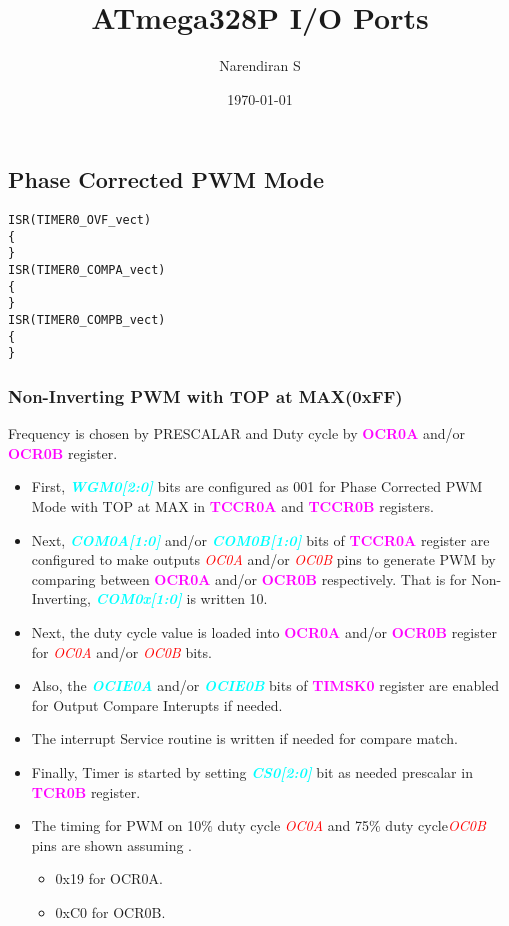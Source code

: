 \documentclass{article}
\title{ATmega328P I/O Ports}
\author{Narendiran S}
\date{\today}
\newcommand{\bitFormat}[1]{\emph{\textbf{\textcolor{cyan}{#1}}}}
\newcommand{\regFormat}[1]{\textbf{\textcolor{magenta}{#1}}}
\newcommand{\pinFormat}[1]{\emph{\textcolor{red}{#1}}}
\begin{document}
\maketitle
\subsection{Phase Corrected PWM Mode}
\begin{verbatim}
ISR(TIMER0_OVF_vect)
{
} 
ISR(TIMER0_COMPA_vect)
{
}
ISR(TIMER0_COMPB_vect)
{
}
\end{verbatim}
\subsubsection{Non-Inverting PWM with TOP at MAX(0xFF)}
\quad Frequency is chosen by PRESCALAR and Duty cycle by \regFormat{OCR0A} and/or \regFormat{OCR0B} register.
\begin{itemize}
    \item First, \bitFormat{WGM0[2:0]} bits are configured as 001 for Phase Corrected PWM Mode with TOP at MAX in \regFormat{TCCR0A} and \regFormat{TCCR0B} registers.
    \item Next, \bitFormat{COM0A[1:0]} and/or \bitFormat{COM0B[1:0]} bits of \regFormat{TCCR0A} register are configured to make outputs \pinFormat{OC0A} and/or \pinFormat{OC0B} pins to generate PWM by comparing between \regFormat{OCR0A} and/or \regFormat{OCR0B} respectively. That is for Non-Inverting, \bitFormat{COM0x[1:0]} is written 10.
    \item Next, the duty cycle value is loaded into \regFormat{OCR0A} and/or \regFormat{OCR0B} register for \pinFormat{OC0A} and/or \pinFormat{OC0B} bits.
    \item Also, the \bitFormat{OCIE0A} and/or \bitFormat{OCIE0B} bits of \regFormat{TIMSK0} register  are enabled for Output Compare Interupts if needed.
    \item The interrupt Service routine is written if needed for compare match.
    \item Finally, Timer is started by setting \bitFormat{CS0[2:0]} bit as needed prescalar in \regFormat{TCR0B} register.
    \item The timing for PWM on 10\% duty cycle \pinFormat{OC0A} and 75\% duty cycle\pinFormat{OC0B} pins are shown assuming .
    \begin{itemize}
        \item 0x19 for OCR0A.
        \item 0xC0 for OCR0B.
    \end{itemize}
\end{itemize}
\end{document}
